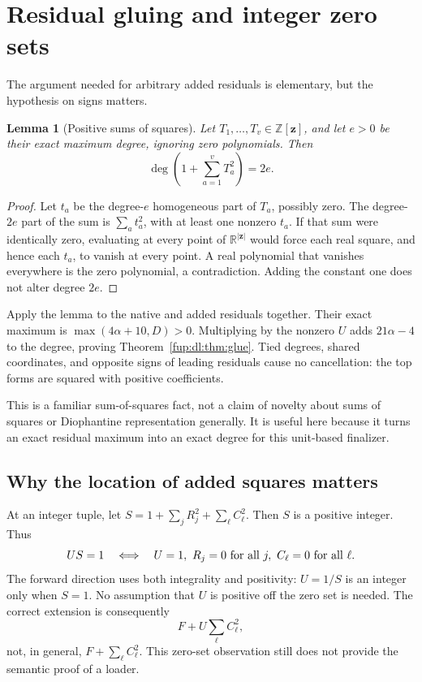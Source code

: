 \documentclass[11pt,letterpaper]{article}
\newtheorem{lemma}[theorem]{Lemma}
\theoremstyle{definition}\newtheorem{definition}[theorem]{Definition}
\theoremstyle{remark}\newtheorem{remark}[theorem]{Remark}
\newcommand{\Z}{\mathbb Z}\newcommand{\Np}{\mathbb Z_{>0}}
\newcommand{\R}{\mathbb R}\newcommand{\Q}{\mathbb Q}\newcommand{\N}{\mathbb N}
\begin{document}
\section{Residual gluing and integer zero sets}\label{fup:dl:sec:gluing}
The argument needed for arbitrary added residuals is elementary, but the hypothesis on signs matters.

\begin{lemma}[Positive sums of squares]\label{fup:dl:lem:sos}
Let $T_1,\ldots,T_v\in\Z[\mathbf z]$, and let $e>0$ be their exact maximum degree, ignoring zero polynomials. Then
\[
 \deg\left(1+\sum_{a=1}^vT_a^2\right)=2e.
\]
\end{lemma}
\begin{proof}
Let $t_a$ be the degree-$e$ homogeneous part of $T_a$, possibly zero. The degree-$2e$ part of the sum is $\sum_a t_a^2$, with at least one nonzero $t_a$. If that sum were identically zero, evaluating at every point of $\R^{\lvert\mathbf z\rvert}$ would force each real square, and hence each $t_a$, to vanish at every point. A real polynomial that vanishes everywhere is the zero polynomial, a contradiction. Adding the constant one does not alter degree $2e$.
\end{proof}

Apply the lemma to the native and added residuals together. Their exact maximum is $\max(4\alpha+10,D)>0$. Multiplying by the nonzero $U$ adds $21\alpha-4$ to the degree, proving Theorem~\ref{fup:dl:thm:glue}. Tied degrees, shared coordinates, and opposite signs of leading residuals cause no cancellation: the top forms are squared with positive coefficients.

This is a familiar sum-of-squares fact, not a claim of novelty about sums of squares or Diophantine representation generally. It is useful here because it turns an exact residual maximum into an exact degree for this unit-based finalizer.

\subsection{Why the location of added squares matters}
At an integer tuple, let $S=1+\sum_jR_j^2+\sum_\ell C_\ell^2$. Then $S$ is a positive integer. Thus
\[
 US=1\quad\Longleftrightarrow\quad U=1,\ R_j=0\ \hbox{for all }j,
 \ C_\ell=0\ \hbox{for all }\ell.
\]
The forward direction uses both integrality and positivity: $U=1/S$ is an integer only when $S=1$. No assumption that $U$ is positive off the zero set is needed. The correct extension is consequently
\[
 F+U\sum_\ell C_\ell^2,
\]
not, in general, $F+\sum_\ell C_\ell^2$. This zero-set observation still does not provide the semantic proof of a loader.
\end{document}
